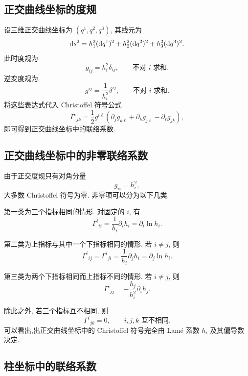 \subsection{正交曲线坐标的度规}

设三维正交曲线坐标为 $(q^{1},q^{2},q^{3})$, 其线元为
\[
\mathop{}\!\mathrm{d} s^{2}
=
h_{1}^{2}(\mathop{}\!\mathrm{d} q^{1})^{2}
+
h_{2}^{2}(\mathop{}\!\mathrm{d} q^{2})^{2}
+
h_{3}^{2}(\mathop{}\!\mathrm{d} q^{3})^{2}.
\]
此时度规为
\[
g_{ij}
=
h_{i}^{2}\delta_{ij},
\qquad
\text{不对 } i \text{ 求和}.
\]
逆变度规为
\[
g^{ij}
=
\frac{1}{h_{i}^{2}}\delta^{ij},
\qquad
\text{不对 } i \text{ 求和}.
\]
将这些表达式代入 Christoffel 符号公式
\[
\Gamma^{i}{}_{jk}
=
\frac{1}{2}g^{i\ell}
\left(
\partial_{j}g_{k\ell}
+
\partial_{k}g_{j\ell}
-
\partial_{\ell}g_{jk}
\right),
\]
即可得到正交曲线坐标中的联络系数. 

\subsection{正交曲线坐标中的非零联络系数}

由于正交度规只有对角分量
\[
g_{ii}=h_{i}^{2},
\]
大多数 Christoffel 符号为零. 非零项可以分为以下几类. 

第一类为三个指标相同的情形. 对固定的 $i$, 有
\begin{equation}
	\Gamma^{i}{}_{ii}
	=
	\frac{1}{h_{i}}\partial_{i}h_{i}
	=
	\partial_{i}\ln h_{i}.
	\label{eq:2.12}
\end{equation}

第二类为上指标与其中一个下指标相同的情形. 若 $i\neq j$, 则
\begin{equation}
	\Gamma^{i}{}_{ij}
	=
	\Gamma^{i}{}_{ji}
	=
	\frac{1}{h_{i}}\partial_{j}h_{i}
	=
	\partial_{j}\ln h_{i}.
	\label{eq:2.13}
\end{equation}

第三类为两个下指标相同而上指标不同的情形. 若 $i\neq j$, 则
\begin{equation}
	\Gamma^{i}{}_{jj}
	=
	-
	\frac{h_{j}}{h_{i}^{2}}\partial_{i}h_{j}.
	\label{eq:2.14}
\end{equation}

除此之外, 若三个指标互不相同, 则
\begin{equation}
	\Gamma^{i}{}_{jk}=0,
	\qquad
	i,j,k \text{ 互不相同}.
	\label{eq:2.15}
\end{equation}
可以看出,出正交曲线坐标中的 Christoffel 符号完全由 Lamé 系数 $h_{i}$ 及其偏导数决定. 

\subsection{柱坐标中的联络系数}

